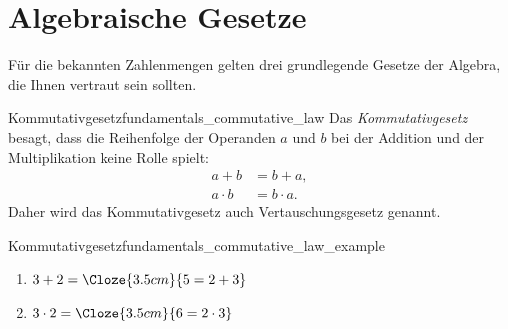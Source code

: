 \section{Algebraische Gesetze}
\label{sec:fundamentals_algebraic_laws}

Für die bekannten Zahlenmengen gelten drei grundlegende Gesetze der Algebra, die Ihnen vertraut sein sollten. \\

\noindent\begin{minipage}{\linewidth}
\begin{DefinitionBox}{Kommutativgesetz}{fundamentals_commutative_law}
  Das \emph{Kommutativgesetz}  besagt, dass die
  Reihenfolge der Operanden $a$ und $b$ bei der Addition und der Multiplikation
  keine Rolle spielt:
  \begin{align*}
    a+b &= b+a, \\
    a\cdot b &= b\cdot a.
  \end{align*}
  Daher wird das Kommutativgesetz auch Vertauschungsgesetz genannt.
\end{DefinitionBox}

\begin{ExampleBox}{Kommutativgesetz}{fundamentals_commutative_law_example}
  \begin{enumerate}[label=\alph*),itemsep=0.6em]
    \item $3+2=\Cloze{3.5cm}{5=2+3}$
    \item $3\cdot 2=\Cloze{3.5cm}{6=2\cdot 3}$
  \end{enumerate}
\end{ExampleBox}
\end{minipage}

\vspace{1cm}

